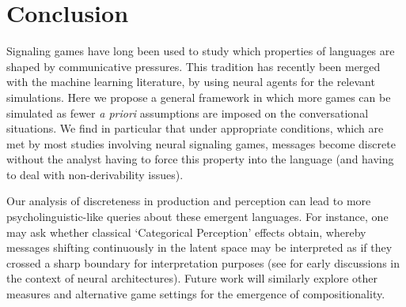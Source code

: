 \documentclass[11pt,a4paper]{article}
\newcommand{\nbEC}[1]{{\leavevmode\color{blue}{\scriptsize#1}}}
\newcommand{\nbSST}[1]{{\leavevmode\color{violet}{\scriptsize#1}}}
\begin{document}

\section{Conclusion}

Signaling games have long been used to study which properties of languages are shaped by communicative pressures. This tradition has recently been merged with the machine learning literature, by using neural agents for the relevant simulations. Here we propose a general framework in which more games can be simulated as fewer \emph{a priori} assumptions are imposed on the conversational situations. We find in particular that under appropriate conditions, which are met by most studies involving neural signaling games, messages become discrete without the analyst having to force this property into the language (and having to deal with non-derivability issues).

Our analysis of discreteness in production and perception can lead to more psycholinguistic-like queries about these emergent languages. For instance, one may ask whether classical `Categorical Perception' effects obtain, whereby messages shifting continuously in the latent space may be interpreted as if they crossed a sharp boundary for interpretation purposes (see \citealp{DamperHarnad-CP} for early discussions in the context of neural architectures).  Future work will similarly explore other measures and alternative game settings for the emergence of compositionality.







\end{document}
